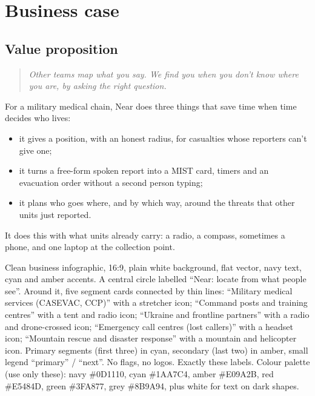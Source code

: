 \chapter{Business case}\label{ch:business}

\section{Value proposition}

\begin{quote}
\emph{Other teams map what you say. We find you when you don't know where you are, by asking the right question.}
\end{quote}

For a military medical chain, Near does three things that save time when time decides who lives:
\begin{itemize}
  \item it gives a position, with an honest radius, for casualties whose reporters can't give one;
  \item it turns a free-form spoken report into a MIST card, timers and an evacuation order without a second person typing;
  \item it plans who goes where, and by which way, around the threats that other units just reported.
\end{itemize}
It does this with what units already carry: a radio, a compass, sometimes a phone, and one laptop at the
collection point.

{Clean business infographic, 16:9, plain white background, flat vector, navy text, cyan and amber accents. A central circle labelled
``Near: locate from what people see''. Around it, five segment cards connected by thin lines: ``Military medical services
(CASEVAC, CCP)'' with a stretcher icon; ``Command posts and training centres'' with a tent and radio icon; ``Ukraine and frontline
partners'' with a radio and drone-crossed icon; ``Emergency call centres (lost callers)'' with a headset icon; ``Mountain rescue and
disaster response'' with a mountain and helicopter icon. Primary segments (first three) in cyan, secondary (last two) in amber, small
legend ``primary'' / ``next''. No flags, no logos. Exactly these labels. Colour palette (use only these): navy \#0D1110, cyan \#1AA7C4, amber \#E09A2B, red \#E5484D, green \#3FA877, grey \#8B9A94, plus white for text on dark shapes.}

